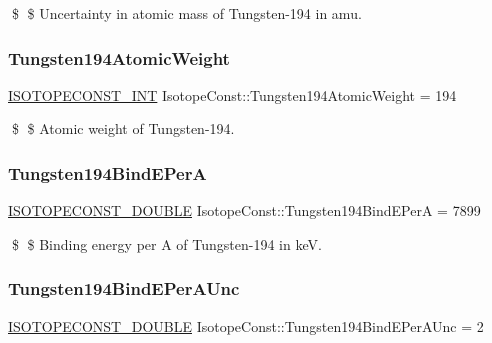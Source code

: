 \$ \$ Uncertainty in atomic mass of Tungsten-\/194 in amu. \mbox{\label{group___isotope_const-_tungsten-_w194_ga8534158d1140c65fb095d9f30df42e7a}} 
\subsubsection{\texorpdfstring{Tungsten194\+Atomic\+Weight}{Tungsten194AtomicWeight}}
{\footnotesize\ttfamily \mbox{\hyperlink{group___isotope_const-_macros_ga5f18360b3e99483a35c32d789e62621c}{I\+S\+O\+T\+O\+P\+E\+C\+O\+N\+S\+T\+\_\+\+I\+NT}} Isotope\+Const\+::\+Tungsten194\+Atomic\+Weight = 194}

\$ \$ Atomic weight of Tungsten-\/194. \mbox{\label{group___isotope_const-_tungsten-_w194_ga79b2bdf16180062ae22c6820e098efb1}} 
\subsubsection{\texorpdfstring{Tungsten194\+Bind\+E\+PerA}{Tungsten194BindEPerA}}
{\footnotesize\ttfamily \mbox{\hyperlink{group___isotope_const-_macros_ga8f45a7272ce02c0b4c65c44636ed719a}{I\+S\+O\+T\+O\+P\+E\+C\+O\+N\+S\+T\+\_\+\+D\+O\+U\+B\+LE}} Isotope\+Const\+::\+Tungsten194\+Bind\+E\+PerA = 7899}

\$ \$ Binding energy per A of Tungsten-\/194 in keV. \mbox{\label{group___isotope_const-_tungsten-_w194_ga33cb5b383a0eb514ff35e19c11cfcc40}} 
\subsubsection{\texorpdfstring{Tungsten194\+Bind\+E\+Per\+A\+Unc}{Tungsten194BindEPerAUnc}}
{\footnotesize\ttfamily \mbox{\hyperlink{group___isotope_const-_macros_ga8f45a7272ce02c0b4c65c44636ed719a}{I\+S\+O\+T\+O\+P\+E\+C\+O\+N\+S\+T\+\_\+\+D\+O\+U\+B\+LE}} Isotope\+Const\+::\+Tungsten194\+Bind\+E\+Per\+A\+Unc = 2}

